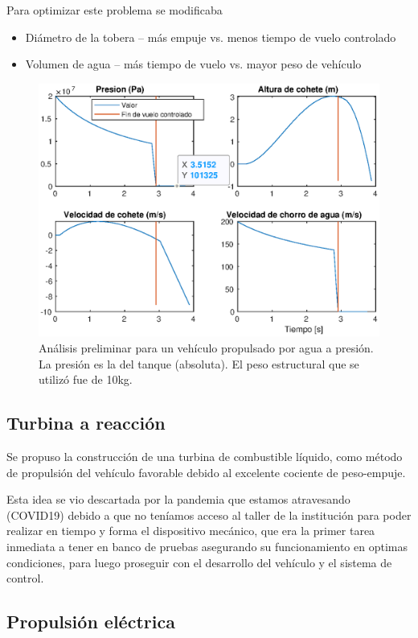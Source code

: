 Para optimizar este problema se modificaba

\begin{itemize}
    \item Diámetro de la tobera -- más empuje vs. menos tiempo de vuelo controlado
    \item Volumen de agua -- más tiempo de vuelo vs. mayor peso de vehículo
\end{itemize}


\begin{figure}[!ht]
    \centering
    \includegraphics[width=0.8\linewidth]{fig/bottlerocket}
    \caption{Análisis preliminar para un vehículo propulsado por agua a presión. La presión es la del tanque (absoluta). El peso estructural que se utilizó fue de 10kg.}
    \label{fig:bottlerocket}
\end{figure}

\subsection{Turbina a reacción}\label{ssec:turbina}
Se propuso la construcción de una turbina de combustible líquido, como método de propulsión
del vehículo favorable debido al excelente cociente de peso-empuje.

Esta idea se vio descartada por la pandemia que estamos atravesando (COVID19) debido a que
no teníamos acceso al taller de la institución para poder realizar en tiempo y forma el
dispositivo mecánico, que era la primer tarea inmediata a tener en banco de pruebas
asegurando su funcionamiento en optimas condiciones, para luego proseguir con el desarrollo
del vehículo y el sistema de control.


\subsection{Propulsión eléctrica} \label{ssec:propelectrica}



